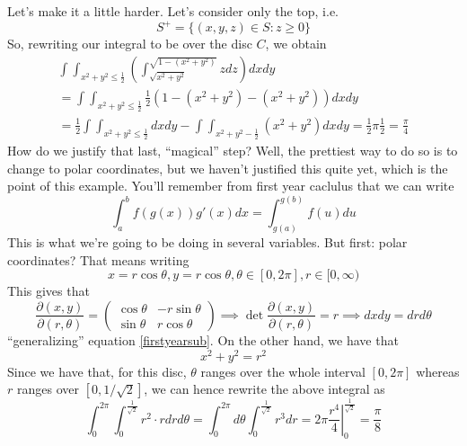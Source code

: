 \documentclass{article}
\newcommand{\prt}[2]{\frac{\partial #1}{\partial #2}}
\begin{document}
\begin{enumerate}
  Let's make it a little harder. Let's consider only the top, i.e.
  \[S^+ = \{(x, y, z) \in S : z \geq 0\}\]
  So, rewriting our integral to be over the disc \(C\), we obtain
  \begin{equation}
  \begin{split}
    \int\int_{x^2 + y^2 \leq \frac{1}{2}}\left(\int_{\sqrt{x^2 + y^2}}^{\sqrt{1 - (x^2 + y^2)}}zdz\right)dxdy \\
    = \int\int_{x^2 + y^2 \leq \frac{1}{2}}\frac{1}{2}(1 - (x^2 + y^2) - (x^2 + y^2))dxdy \\
    = \frac{1}{2}\int\int_{x^2 + y^2 \leq \frac{1}{2}}dxdy - \int\int_{x^2 + y^2 - \frac{1}{2}}(x^2 + y^2)dxdy = \frac{1}{2}\pi\frac{1}{2} = \frac{\pi}{4}
  \end{split}
  \end{equation}
  How do we justify that last, ``magical'' step? Well, the prettiest way to do so is to change to polar coordinates, but we haven't justified this quite yet, which is the point of this example. You'll remember from first year caclulus that we can write
  \begin{equation}
    \int_a^bf(g(x))g'(x)dx = \int_{g(a)}^{g(b)}f(u)du
    \label{firstyearsub}
  \end{equation}
  This is what we're going to be doing in several variables. But first: polar coordinates? That means writing
  \begin{equation}
    x = r\cos\theta, y = r\cos\theta, \theta \in [0, 2\pi], r \in [0, \infty)
  \end{equation}
  This gives that
  \begin{equation}
    \prt{(x, y)}{(r, \theta)} = \begin{pmatrix}\cos\theta & -r\sin\theta \\ \sin\theta & r\cos\theta\end{pmatrix} \implies \det\prt{(x, y)}{(r, \theta)} = r \implies dxdy = drd\theta
  \end{equation}
  ``generalizing'' equation \ref{firstyearsub}. On the other hand, we have that
  \begin{equation}
    x^2 + y^2 = r^2
  \end{equation}
  Since we have that, for this disc, \(\theta\) ranges over the whole interval \([0, 2\pi]\) whereas \(r\) ranges over \([0, 1/\sqrt{2}]\), we can hence rewrite the above integral as
  \begin{equation}
    \int_0^{2\pi}\int_0^{\frac{1}{\sqrt{2}}}r^2 \cdot rdrd\theta =
    \int_0^{2\pi}d\theta\int_0^{\frac{1}{\sqrt{2}}}r^3dr =
    \left.2\pi\frac{r^4}{4}\right|_{0}^{\frac{1}{\sqrt{2}}} = \frac{\pi}{8}
  \end{equation}

\end{enumerate}
\end{document}
